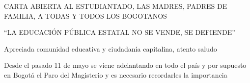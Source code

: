 \documentclass[letterpaper,spanish]{letter}
\begin{document}
\begin{letter}

\begin{center}
CARTA ABIERTA AL ESTUDIANTADO, LAS MADRES, PADRES DE FAMILIA, A TODAS Y TODOS LOS BOGOTANOS
\end{center}

\begin{center}
``LA EDUCACIÓN PÚBLICA ESTATAL NO SE VENDE, SE DEFIENDE''
\end{center}

Apreciada comunidad educativa y ciudadanía capitalina, atento saludo
	
Desde el pasado 11 de mayo se viene adelantando en todo el país y por supuesto en Bogotá el Paro del Magisterio y es necesario recordarles la importancia 
\closing{}


\end{letter}
\end{document}
